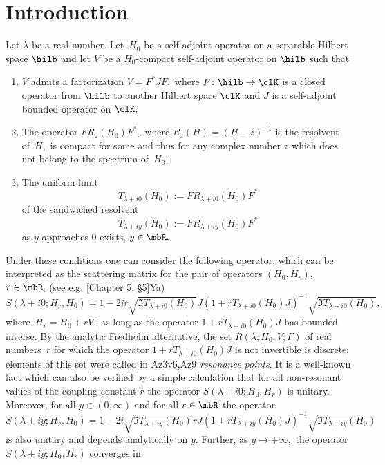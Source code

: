 \documentclass[11pt]{amsart}
\numberwithin{equation}{section}
\begin{document}
\section*{Introduction}
Let $\lambda$ be a real number. Let~$H_0$ be a self-adjoint
operator on a separable Hilbert space $\hilb$ and let $V$ be a
$H_0$-compact self-adjoint operator on $\hilb$ such that
\begin{enumerate}
  \item $V$ admits a factorization $V = F^*JF,$ where $F \colon \hilb \to \clK$ is a closed operator from $\hilb$
  to another Hilbert space $\clK$ and $J$ is a self-adjoint bounded operator on $\clK;$
  \item The operator $FR_z(H_0)F^*,$ where $R_z(H) = (H-z)^{-1}$ is the resolvent of~$H,$ is compact for some and thus for any complex number $z$ which does not belong to the spectrum of~$H_0;$
  \item The uniform limit
  $$
     T_{\lambda+i0}(H_0) := FR_{\lambda+i0}(H_0)F^*
  $$
  of the sandwiched resolvent $$T_{\lambda+iy}(H_0):=FR_{\lambda+iy}(H_0)F^*$$
  as $y$ approaches $0$ exists, $y \in \mbR.$
\end{enumerate}
Under these conditions one can consider the following operator, which can be interpreted as the scattering matrix for the pair of operators $(H_0,H_r),$ $r \in \mbR,$
(see e.g. {\futurelet\NChar\CleverCite}[Chapter 5, \S 5]{Ya})
\begin{equation} \label{F: stationary formula}
  S(\lambda+i0; H_r,H_0) = 1 - 2ir \sqrt{\Im T_{\lambda+i0}(H_0)} J (1+rT_{\lambda+i0}(H_0)J)^{-1}\sqrt{\Im T_{\lambda+i0}(H_0)},
\end{equation}
where~$H_r = H_0 + rV,$ as long as the operator
$1+rT_{\lambda+i0}(H_0)J$ has bounded inverse. By the analytic
Fredholm alternative, the set $R(\lambda; H_0,V; F)$ of real
numbers~$r$ for which the operator $1+rT_{\lambda+i0}(H_0)J$ is
not invertible is discrete; elements of this set were called in
{\futurelet\NChar\CleverCite}{Az3v6,Az9} \emph{resonance points}.
It is a well-known fact which can also be verified by a simple calculation that for all non-resonant values of the coupling constant $r$ the operator $S(\lambda+i0; H_0,H_r)$ 
is unitary. Moreover, for all $y \in (0,\infty)$ and for all $r \in \mbR$ the operator
$$
  S(\lambda+iy; H_r,H_0) = 1 - 2i \sqrt{\Im T_{\lambda+iy}(H_0)} rJ (1+rT_{\lambda+iy}(H_0)J)^{-1}\sqrt{\Im T_{\lambda+iy}(H_0)}
$$
is also unitary and depends analytically on $y.$ Further, as $y
\to +\infty,$ the operator $S(\lambda+iy; H_0,H_r)$ converges in
\end{document}
